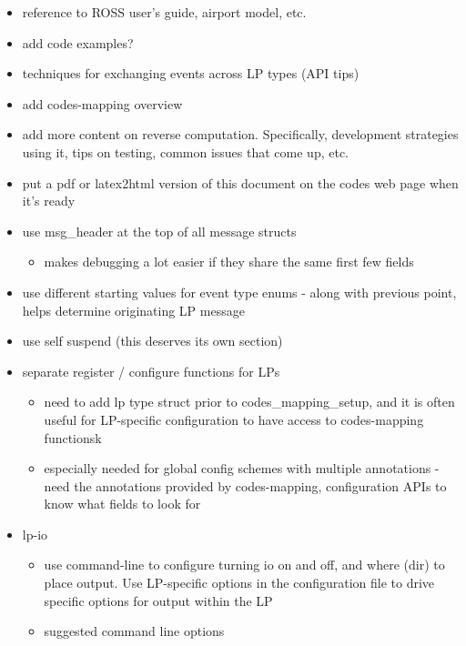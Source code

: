 \documentclass[conference,10pt,compsocconf,onecolumn]{IEEEtran}
\begin{document}
\begin{itemize}
    \item reference to ROSS user's guide, airport model, etc.
    \item add code examples?
    \item techniques for exchanging events across LP types (API tips)
    \item add codes-mapping overview
    \item add more content on reverse computation. Specifically, development
        strategies using it, tips on testing, common issues that come up, etc.
    \item put a pdf or latex2html version of this document on the codes web page
        when it's ready
    \item use msg\_header at the top of all message structs
        \begin{itemize}
            \item makes debugging a lot easier if they share the same first few fields
        \end{itemize}
    \item use different starting values for event type enums - along with
        previous point, helps determine originating LP message 
    \item use self suspend (this deserves its own section)
    \item separate register / configure functions for LPs
        \begin{itemize}
            \item need to add lp type struct prior to codes\_mapping\_setup,
                and it is often useful for LP-specific configuration to have
                access to codes-mapping functionsk
                \item especially needed for global config schemes with multiple
                    annotations - need the annotations provided by
                    codes-mapping, configuration APIs to know what fields to
                    look for
        \end{itemize}
    \item lp-io
        \begin{itemize}
            \item use command-line to configure turning io on and off, and
                where (dir) to place output. Use LP-specific options in the
                configuration file to drive specific options for output within
                the LP
            \item suggested command line options

\end{itemize}
\end{itemize}
\end{document}
